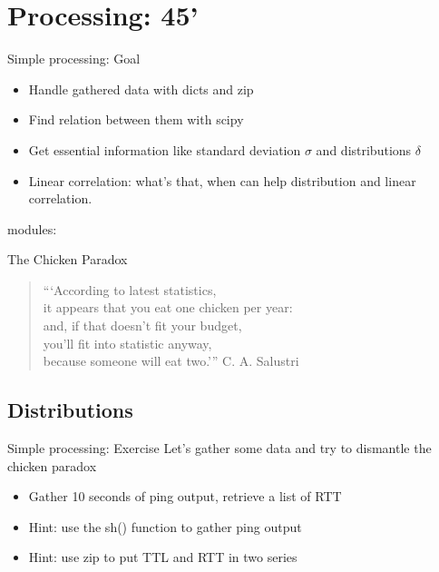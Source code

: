 \section{Processing: 45'}

\begin{pyframe}{Simple processing: Goal}
\begin{itemize}
\item Handle gathered data with dicts and zip
\item Find relation between them with scipy
\item Get essential information like standard deviation $\sigma$ and distributions $\delta$
\item Linear correlation: what's that, when can help
distribution and linear correlation.
\end{itemize}
modules: 
\end{pyframe}


\begin{pyframe}{The Chicken Paradox}
\begin{verse}
```According to latest statistics, \\
it appears that you eat one chicken per year: \\
and, if that doesn't fit your budget,\\
you'll fit into statistic anyway,\\
because someone will eat two.'''
\hfill C. A. Salustri
\end{verse}
\end{pyframe}

\subsection{Distributions}
\begin{pyframe}{Simple processing: Exercise}
Let's gather some data and try to dismantle the chicken paradox
\begin{itemize}
\item Gather 10 seconds of ping output, retrieve a list of RTT
\item Hint: use the sh() function to gather ping output
\item Hint: use zip to put TTL and RTT in two series
\end{itemize}
\end{pyframe}

